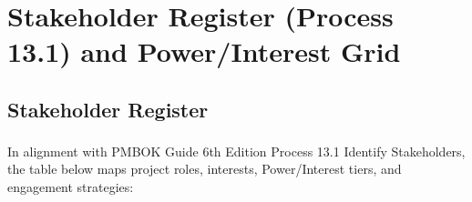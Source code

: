 \documentclass[11pt,a4paper]{article}
\begin{document}
\clearpage

\section{Stakeholder Register (Process 13.1) and Power/Interest Grid}

\subsection{Stakeholder Register}
In alignment with PMBOK\textsuperscript{\textregistered} Guide 6th Edition Process 13.1 Identify Stakeholders, the table below maps project roles, interests, Power/Interest tiers, and engagement strategies:
\end{document}
